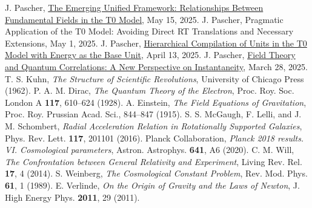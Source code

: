 \documentclass[12pt,a4paper]{article}
\begin{document}
\begin{thebibliography}{99}
		 J. Pascher, \href{https://github.com/jpascher/T0-Time-Mass-Duality/tree/main/2/pdf/English/ausblicke_En.pdf}{The Emerging Unified Framework: Relationships Between Fundamental Fields in the T0 Model}, May 15, 2025.
		 J. Pascher, {Pragmatic Application of the T0 Model: Avoiding Direct RT Translations and Necessary Extensions}, May 1, 2025.
		 J. Pascher, \href{https://github.com/jpascher/T0-Time-Mass-Duality/tree/main/2/pdf/English/NatEinheitenSystematikEn.pdf}{Hierarchical Compilation of Units in the T0 Model with Energy as the Base Unit}, April 13, 2025.
		 J. Pascher, \href{https://github.com/jpascher/T0-Time-Mass-Duality/tree/main/2/pdf/English/FeldtheorieQuantenEn.pdf}{Field Theory and Quantum Correlations: A New Perspective on Instantaneity}, March 28, 2025.
		 T. S. Kuhn, \textit{The Structure of Scientific Revolutions}, University of Chicago Press (1962).
		 P. A. M. Dirac, \textit{The Quantum Theory of the Electron}, Proc. Roy. Soc. London A \textbf{117}, 610--624 (1928).
		 A. Einstein, \textit{The Field Equations of Gravitation}, Proc. Roy. Prussian Acad. Sci., 844--847 (1915).
		 S. S. McGaugh, F. Lelli, and J. M. Schombert, \textit{Radial Acceleration Relation in Rotationally Supported Galaxies}, Phys. Rev. Lett. \textbf{117}, 201101 (2016).
		 Planck Collaboration, \textit{Planck 2018 results. VI. Cosmological parameters}, Astron. Astrophys. \textbf{641}, A6 (2020).
		 C. M. Will, \textit{The Confrontation between General Relativity and Experiment}, Living Rev. Rel. \textbf{17}, 4 (2014).
		 S. Weinberg, \textit{The Cosmological Constant Problem}, Rev. Mod. Phys. \textbf{61}, 1 (1989).
		 E. Verlinde, \textit{On the Origin of Gravity and the Laws of Newton}, J. High Energy Phys. \textbf{2011}, 29 (2011).
	\end{thebibliography}
	
\end{document}
